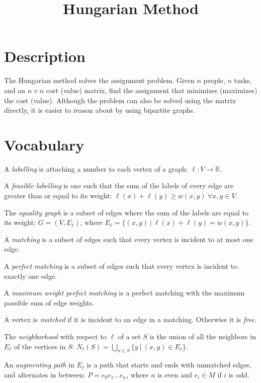 \documentclass[12pt]{article}
\newcommand{\lskip}{\vspace{\baselineskip}}
\begin{document}
\title{Hungarian Method}
\author{}
\maketitle


\section*{Description}
The Hungarian method solves the assignment problem. Given $n$ people, $n$ tasks, and an $n \times n$ cost (value) matrix, find the assignment that minimizes (maximizes) the cost (value). Although the problem can also be solved using the matrix directly, it is easier to reason about by using bipartite graphs.

\section*{Vocabulary}

\noindent A \emph{labelling} is attaching a number to each vertex of a graph: $\ell: V \rightarrow \mathbb{R}$.\lskip

\noindent A \emph{feasible labelling} is one such that the sum of the labels of every edge are greater than or equal to its weight: $\ell(x) + \ell(y) \geq w(x,y) \ \forall x,y \in V$.\lskip

\noindent The \emph{equality graph} is a subset of edges where the sum of the labels are equal to its weight: $G = (V, E_\ell)$, where $E_\ell = \{ (x,y) \ | \ \ell(x) + \ell(y) = w(x,y) \}$.\lskip

\noindent A \emph{matching} is a subset of edges such that every vertex is incident to at most one edge.\lskip

\noindent A \emph{perfect matching} is a subset of edges such that every vertex is incident to exactly one edge.\lskip

\noindent A \emph{maximum weight perfect matching} is a perfect matching with the maximum possible sum of edge weights.\lskip

\noindent A vertex is \emph{matched} if it is incident to an edge in a matching. Otherwise it is \emph{free}.\lskip

\noindent The \emph{neighborhood} with respect to $\ell$ of a set $S$ is the union of all the neighbors in $E_\ell$ of the vertices in $S$: $N_\ell(S) = \bigcup_{x \in S}\{ y \ | \ (x,y) \in E_\ell \}$.\lskip

\noindent An \emph{augmenting path} in $E_\ell$ is a path that starts and ends with unmatched edges, and alternates in between: $P = e_0 e_1\ldots e_n$, where $n$ is even and $e_i \in M$ if $i$ is odd.\lskip
\end{document}
